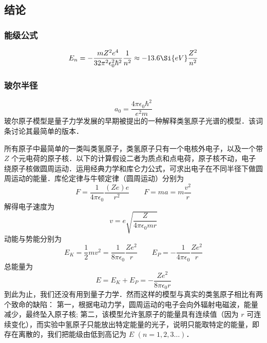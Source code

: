 
\subsection{结论}
\subsubsection{能级公式}
\begin{equation}
E_n =  - \frac{m Z^2 e^4}{32 \pi^2 \epsilon_0^2 \hbar ^2} \frac{1}{n^2} \approx - 13.6\Si{eV} \frac{Z^2}{n^2}
\end{equation}
\subsubsection{玻尔半径}
\begin{equation}
a_0 = \frac{4\pi \epsilon_0 \hbar^2}{e^2 m}
\end{equation}
玻尔原子模型是量子力学发展的早期被提出的一种解释类氢原子光谱的模型．该词条讨论其最简单的版本．

所有原子中最简单的一类叫类氢原子，类氢原子只有一个电核外电子，以及一个带 $Z$ 个元电荷的原子核．以下的计算假设二者为质点和点电荷，原子核不动，电子绕原子核做圆周运动．运用经典力学和库仑力公式，可求出电子在不同半径下做圆周运动的能量．库伦定律与牛顿定律（圆周运动）分别为
\begin{equation}
F = \frac{1}{4\pi \epsilon_0} \frac{(Ze)e}{r^2}
\qquad
F = ma = m\frac{v^2}{r}
\end{equation}
解得电子速度为
\begin{equation}\label{BohrMd_eq2}
v = e\sqrt{\frac{Z}{4\pi \epsilon_0 mr}} 
\end{equation}
动能与势能分别为
\begin{equation}
E_K = \frac12 m v^2 = \frac{1}{8\pi\epsilon_0} \frac{Z e^2}{r}
\qquad
E_P =  -\frac{1}{4\pi\epsilon_0} \frac{Ze^2}{r}
\end{equation}   
总能量为
\begin{equation}\label{BohrMd_eq4}
E = E_K + E_P =  -\frac{Z e^2}{8\pi\epsilon_0 r}
\end{equation}
到此为止，我们还没有用到量子力学．然而这样的模型与真实的类氢原子相比有两个致命的缺陷： 第一，根据电动力学，圆周运动的电子会向外辐射电磁波，能量减少，最终坠入原子核; 第二，该模型允许氢原子的能量具有连续值（因为 $r$ 可连续变化），而实验中氢原子只能放出特定能量的光子，说明只能取特定的能量，即存在离散的，我们把能级由低到高记为 $E$  $(n = 1,2,3\dots)$． 

